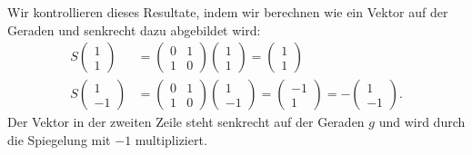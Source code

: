 Wir kontrollieren dieses Resultate, indem wir berechnen wie ein Vektor
auf der Geraden und senkrecht dazu abgebildet wird:
\begin{align*}
S
\begin{pmatrix}1\\1\end{pmatrix}
&=
\begin{pmatrix}0&1\\1&0\end{pmatrix}
\begin{pmatrix}1\\1\end{pmatrix}
=
\begin{pmatrix}1\\1\end{pmatrix}
\\
S
\begin{pmatrix}1\\-1\end{pmatrix}
&=
\begin{pmatrix}0&1\\1&0\end{pmatrix}
\begin{pmatrix}1\\-1\end{pmatrix}
=
\begin{pmatrix}-1\\1\end{pmatrix}
=
-
\begin{pmatrix}1\\-1\end{pmatrix}.
\end{align*}
Der Vektor in der zweiten Zeile steht senkrecht auf der Geraden $g$ 
und wird durch die Spiegelung mit $-1$ multipliziert.

